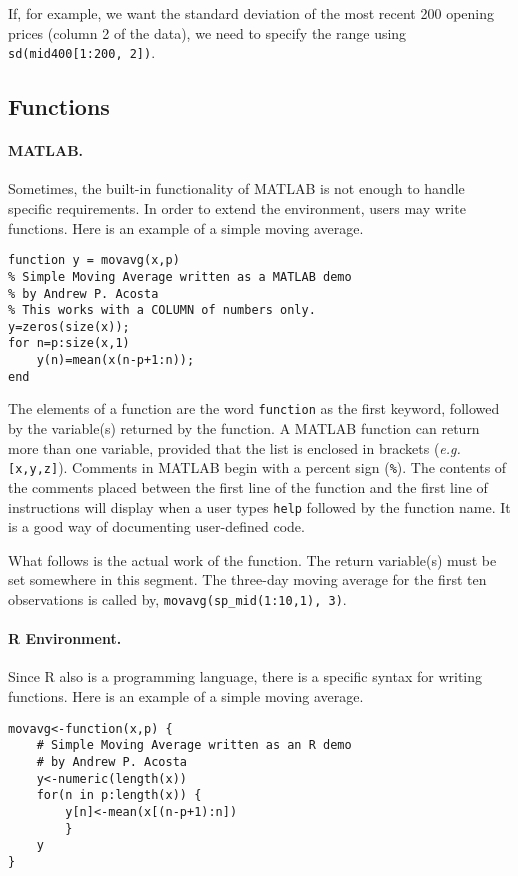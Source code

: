 If, for example, we want the standard deviation of the most recent 200 opening prices (column 2 of the data), we need to specify the range using \texttt{sd(mid400[1:200, 2])}.

\subsection{Functions}
\paragraph{MATLAB.} Sometimes, the built-in functionality of MATLAB is not enough to handle specific requirements. In order to extend the environment, users may write functions. Here is an example of a simple moving average.
\begin{verbatim}
function y = movavg(x,p)
% Simple Moving Average written as a MATLAB demo
% by Andrew P. Acosta
% This works with a COLUMN of numbers only.
y=zeros(size(x));
for n=p:size(x,1)
    y(n)=mean(x(n-p+1:n));
end
\end{verbatim}

The elements of a function are the word \texttt{function} as the first keyword, followed by the variable(s) returned by the function. A MATLAB function can return more than one variable, provided that the list is enclosed in brackets (\textit{e.g.} \texttt{[x,y,z]}). Comments in MATLAB begin with a percent sign (\texttt{\%}). The contents of the comments placed between the first line of the function and the first line of instructions will display when a user types \texttt{help} followed by the function name. It is a good way of documenting user-defined code.

What follows is the actual work of the function. The return variable(s) must be set somewhere in this segment. The three-day moving average for the first ten observations is called by, \texttt{movavg(sp\_mid(1:10,1), 3)}.


\paragraph{R Environment.} Since R also is a programming language, there is a specific syntax for writing functions. Here is an example of a simple moving average.
\begin{verbatim}
movavg<-function(x,p) { 
    # Simple Moving Average written as an R demo 
    # by Andrew P. Acosta
    y<-numeric(length(x))
    for(n in p:length(x)) {
        y[n]<-mean(x[(n-p+1):n])
        }
    y
}
\end{verbatim}

